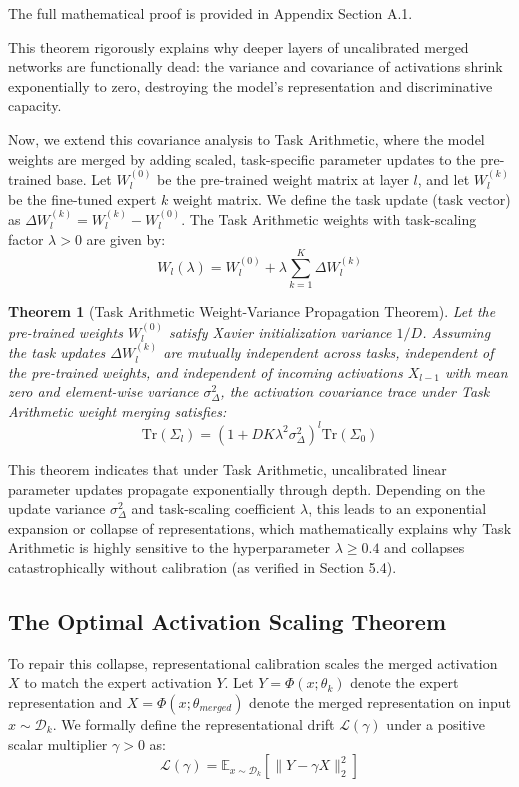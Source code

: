 \documentclass{article}
\theoremstyle{plain}
\newtheorem{theorem}{Theorem}[section]
\theoremstyle{definition}
\theoremstyle{remark}
\begin{document}
The full mathematical proof is provided in Appendix Section A.1.

This theorem rigorously explains why deeper layers of uncalibrated merged networks are functionally dead: the variance and covariance of activations shrink exponentially to zero, destroying the model's representation and discriminative capacity.

Now, we extend this covariance analysis to Task Arithmetic, where the model weights are merged by adding scaled, task-specific parameter updates to the pre-trained base. Let $W_l^{(0)}$ be the pre-trained weight matrix at layer $l$, and let $W_l^{(k)}$ be the fine-tuned expert $k$ weight matrix. We define the task update (task vector) as $\Delta W_l^{(k)} = W_l^{(k)} - W_l^{(0)}$. The Task Arithmetic weights with task-scaling factor $\lambda > 0$ are given by:
$$W_l(\lambda) = W_l^{(0)} + \lambda \sum_{k=1}^K \Delta W_l^{(k)}$$

\begin{theorem}[Task Arithmetic Weight-Variance Propagation Theorem]\label{thm:task_arithmetic_variance}
Let the pre-trained weights $W_l^{(0)}$ satisfy Xavier initialization variance $1/D$. Assuming the task updates $\Delta W_l^{(k)}$ are mutually independent across tasks, independent of the pre-trained weights, and independent of incoming activations $X_{l-1}$ with mean zero and element-wise variance $\sigma_{\Delta}^2$, the activation covariance trace under Task Arithmetic weight merging satisfies:
$$\text{Tr}(\Sigma_l) = \left(1 + D K \lambda^2 \sigma_{\Delta}^2 \right)^l \text{Tr}(\Sigma_0)$$
\end{theorem}

This theorem indicates that under Task Arithmetic, uncalibrated linear parameter updates propagate exponentially through depth. Depending on the update variance $\sigma_{\Delta}^2$ and task-scaling coefficient $\lambda$, this leads to an exponential expansion or collapse of representations, which mathematically explains why Task Arithmetic is highly sensitive to the hyperparameter $\lambda \ge 0.4$ and collapses catastrophically without calibration (as verified in Section 5.4).

\subsection{The Optimal Activation Scaling Theorem}
To repair this collapse, representational calibration scales the merged activation $X$ to match the expert activation $Y$. Let $Y = \Phi(x; \theta_k)$ denote the expert representation and $X = \Phi(x; \theta_{merged})$ denote the merged representation on input $x \sim \mathcal{D}_k$.
We formally define the representational drift $\mathcal{L}(\gamma)$ under a positive scalar multiplier $\gamma > 0$ as:
$$\mathcal{L}(\gamma) = \mathbb{E}_{x \sim \mathcal{D}_k} \left[ \| Y - \gamma X \|_2^2 \right]$$
\end{document}
